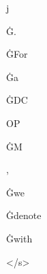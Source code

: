 \documentclass[varwidth]{standalone}
\begin{document}
\begin{CJK*}{UTF8}{gbsn}
{{{\colorbox{red!0.047597695}{\strut j} \colorbox{red!0.054390933}{\strut Ġ.} \colorbox{red!0.35003427}{\strut ĠFor} \colorbox{red!0.34031633}{\strut Ġa} \colorbox{red!0.1465242}{\strut ĠDC} \colorbox{red!0.15451053}{\strut OP} \colorbox{red!0.07014893}{\strut ĠM} \colorbox{red!0.30573726}{\strut ,} \colorbox{red!0.22988605}{\strut Ġwe} \colorbox{red!0.13463375}{\strut Ġdenote} \colorbox{red!0.09268654}{\strut Ġwith} \colorbox{red!0.3415461}{\strut </s>} 
}}}
\end{CJK*}
\end{document}
